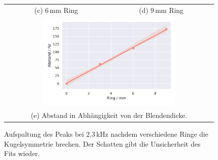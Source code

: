 \begin{figure}[H]
\begin{tabular}{cc}
  (c)  $6 \,\si{\milli\metre}$ Ring & (d)  $9 \,\si{\milli\metre}$ Ring \\[6pt]
  \multicolumn{2}{c}{\includegraphics[width=0.65\textwidth]{Daten/Wasserstoff/neu/spaltGesamt.pdf}}\\[6pt]
  \multicolumn{2}{c}{(e) Abstand in Abhängigkeit von der Blendendicke.}
  \end{tabular}
  \caption{Aufspaltung des Peaks bei $2.3 \,\si{\kilo\hertz}$ nachdem verschiedene Ringe die Kugelsymmetrie brechen. Der Schatten gibt die Unsicherheit des Fits wieder. } 
  \label{fig:hspalt}
\end{figure}
